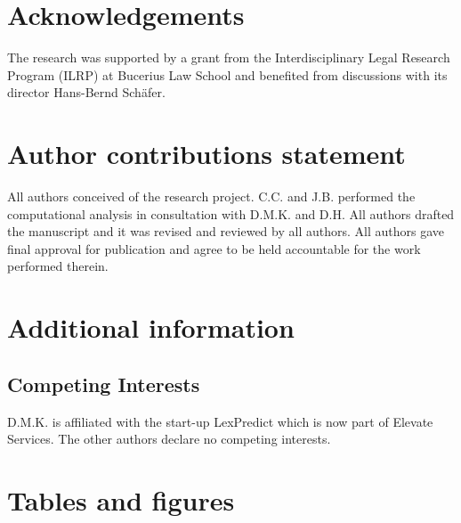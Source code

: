 \documentclass[fleqn,12pt]{wlscirep}
\begin{document}


\section*{Acknowledgements}

The research was supported by a grant from the Interdisciplinary Legal Research Program (ILRP) at Bucerius Law School and benefited from discussions with its director Hans-Bernd Schäfer. 

\section*{Author contributions statement}

All authors conceived of the research project.  
C.C. and J.B. performed the computational analysis in consultation with D.M.K. and D.H.  
All authors drafted the manuscript and it was revised and reviewed by all authors. 
All authors gave final approval for publication and agree to be held accountable for the work performed therein.

\section*{Additional information}

\subsection*{Competing Interests}

D.M.K. is affiliated with the start-up LexPredict which is now part of Elevate Services.
The other authors declare no competing interests.

\clearpage

\section*{Tables and figures}


\end{document}
